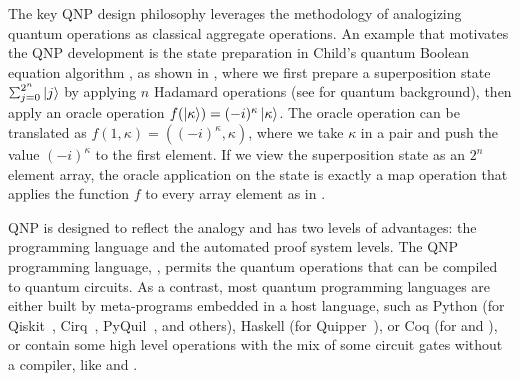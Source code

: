 The key QNP design philosophy leverages the methodology of analogizing quantum operations as classical aggregate operations.
An example that motivates the QNP development is the state preparation in Child's quantum Boolean equation algorithm \cite{ChildsNAND}, as shown in ,
where we first prepare a superposition state $\Msum_{j=0}^{2^n}\ket{j}$ by applying $n$ Hadamard operations (see  for quantum background), then apply an oracle operation $f(\left\vert{\kappa}\right\rangle)=(-i)^{\kappa}\left\vert{\kappa}\right\rangle$.
The oracle operation can be translated as $f(1,\kappa)=((-i)^{\kappa},\kappa)$, where we take $\kappa$ in a pair and push the value $(-i)^{\kappa}$ to the first element.
If we view the superposition state as an $2^n$ element array, the oracle application on the state is exactly a map operation that applies the function $f$ to every array element as in .

QNP is designed to reflect the analogy and has two levels of advantages: the programming language and the automated proof system levels. The QNP programming language, \qafny, permits the quantum operations that can be compiled to quantum circuits. As a contrast, most quantum programming languages are either built by meta-programs embedded in a host language, such as Python (for Qiskit~\cite{Qiskit}, Cirq~\cite{cirq}, PyQuil~\cite{PyQuil}, and others), Haskell (for Quipper~\cite{Green2013}), or Coq (for \sqir and \voqc \cite{VOQC}), or contain some high level operations with the mix of some circuit gates without a compiler, like \cite{sliqlanguage} and \cite{qsharp}.

